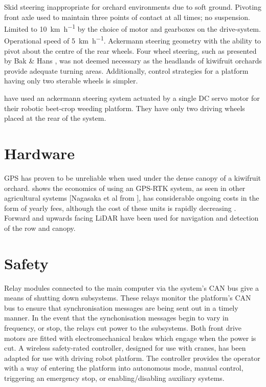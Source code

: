 \documentclass[preprint,authoryear,12pt]{elsarticle}
\begin{document}
    Skid steering inappropriate for orchard environments due to soft ground.
    Pivoting front axle used to maintain three points of contact at all times; no suspension.
    Limited to \SI{10}{\kilo\meter\per\hour} by the choice of motor and gearboxes on the drive-system.
    Operational speed of \SI{5}{\kilo\meter\per\hour}.
    Ackermann steering geometry with the ability to pivot about the centre of the rear wheels.
    Four wheel steering, such as presented by Bak \& Hans \citep{Bak2004}, was not deemed necessary as the headlands of kiwifruit orchards provide adequate turning areas.
    Additionally, control strategies for a platform having only two sterable wheels is simpler.



    \citep{Astrand2002} have used an ackermann steering system actuated by a single DC servo motor for their robotic beet-crop weeding platform. They have only two driving wheels placed at the rear of the system.


\section{Hardware}
\label{sect:hardware}
    GPS has proven to be unreliable when used under the dense canopy of a kiwifruit orchard.
    \citep{Pedersen2006} shows the economics of using an GPS-RTK system, as seen in other agricultural systems \citep{Bak2004,Ruckelshausen2009}[Nagasaka et al from \citep{Torii2000}], has considerable ongoing costs in the form of yearly fees, although the cost of these units is rapidly decreasing \citep{Torii2000}.
    Forward and upwards facing LiDAR have been used for navigation and detection of the row and canopy.

\section{Safety}
\label{sect:safety}
    Relay modules connected to the main computer via the system's CAN bus give a means of shutting down subsystems.
    These relays monitor the platform's CAN bus to ensure that synchronisation messages are being sent out in a timely manner.
    In the event that the synchonisation messages begin to vary in frequency, or stop, the relays cut power to the subsystems.
    Both front drive motors are fitted with electromechanical brakes which engage when the power is cut.
    A wireless safety-rated controller, designed for use with cranes, has been adapted for use with driving robot platform.
    The controller provides the operator with a way of entering the platform into autonomous mode, manual control, triggering an emergency stop, or enabling/disabling auxiliary systems.
\end{document}
